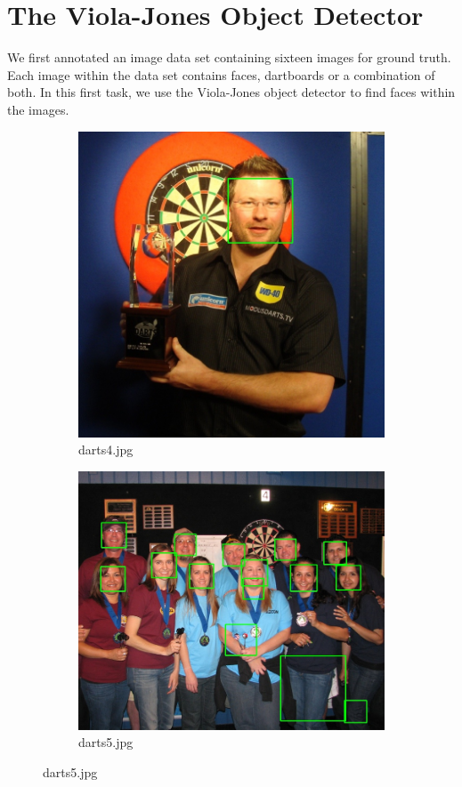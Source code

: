 \documentclass[conference]{IEEEtran}
\begin{document}
\section{The Viola-Jones Object Detector}
We first annotated an image data set containing sixteen images for ground truth. Each image within the data set contains faces, dartboards or a combination of both. In this first task, we use the Viola-Jones object detector to find faces within the images. 
\begin{figure}[htb]
\centering
\begin{subfigure}{.5\linewidth}
  \centering
  \includegraphics[width=.9\linewidth]{images/detected0.jpg}
  \caption{darts4.jpg}
  \label{fig:sub1}
\end{subfigure}%
\begin{subfigure}{.5\linewidth}
  \centering
  \includegraphics[width=.9\linewidth]{images/detected1.jpg}
  \caption{darts5.jpg}
  \label{fig:sub2}
\end{subfigure}


\end{figure}
\end{document}
